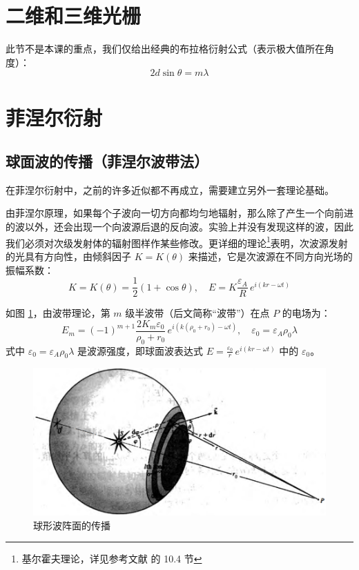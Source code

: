 \documentclass[UTF8]{report}
\theoremstyle{MyLineTheoremStyle} %
\theoremstyle{MyBlockTheoremStyle} %
\theoremstyle{MySubsubsectionStyle} %
\begin{document}
\section{二维和三维光栅}
此节不是本课的重点，我们仅给出经典的布拉格衍射公式（表示极大值所在角度）：
\begin{equation}
2d \sin \theta = m\lambda
\end{equation}

\section{菲涅尔衍射}

\subsection{球面波的传播（菲涅尔波带法）}

在菲涅尔衍射中，之前的许多近似都不再成立，需要建立另外一套理论基础。

由菲涅尔原理，如果每个子波向一切方向都均匀地辐射，那么除了产生一个向前进的波以外，还会出现一个向波源后退的反向波。实验上并没有发现这样的波，因此我们必须对次级发射体的辐射图样作某些修改。更详细的理论\footnote{基尔霍夫理论，详见参考文献 \cite{Optics} 的 10.4 节}表明，次波源发射的光具有方向性，由倾斜因子 $K = K(\theta)$ 来描述，它是次波源在不同方向光场的振幅系数：
\begin{equation}
    K = K(\theta) = \frac{1}{2}\left(1 + \cos \theta\right),\quad E = K\frac{\varepsilon_A}{R} \,e^{i(kr - \omega t)}
\end{equation}

如图 \ref{球形波阵面的传播}，由波带理论，第 $m$ 级半波带（后文简称“波带”）在点 $P$ 的电场为：
\begin{equation}
E_m = (-1)^{m+1} \frac{2 K_m \varepsilon_0}{\rho_0 + r_0} \,e^{i\left(k(\rho_0 + r_0) - \omega t\right)},\quad \varepsilon_0 = \varepsilon_A \rho_0 \lambda
\end{equation}
式中 $\varepsilon_0 = \varepsilon_A \rho_0 \lambda$ 是波源强度，即球面波表达式 $E = \frac{\varepsilon_0}{r} \,e^{i(kr - \omega t)}$ 中的 $\varepsilon_0$。

\begin{figure}[H]\centering
    \includegraphics[width=0.65\columnwidth]{assets/4/4.5 球形波阵面的传播.png}
    \caption{球形波阵面的传播}\label{球形波阵面的传播}
\end{figure}
\end{document}
